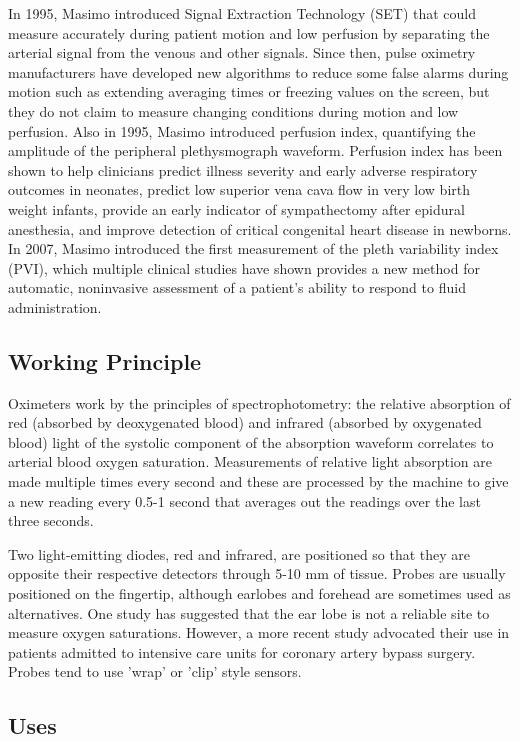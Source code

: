 \documentclass[11pt]{article}
\begin{document}
In 1995, Masimo introduced Signal Extraction Technology (SET) that could measure accurately during patient motion and low perfusion by separating the arterial signal from the venous and other signals. Since then, pulse oximetry manufacturers have developed new algorithms to reduce some false alarms during motion such as extending averaging times or freezing values on the screen, but they do not claim to measure changing conditions during motion and low perfusion. Also in 1995, Masimo introduced perfusion index, quantifying the amplitude of the peripheral plethysmograph waveform. Perfusion index has been shown to help clinicians predict illness severity and early adverse respiratory outcomes in neonates, predict low superior vena cava flow in very low birth weight infants, provide an early indicator of sympathectomy after epidural anesthesia, and improve detection of critical congenital heart disease in newborns. In 2007, Masimo introduced the first measurement of the pleth variability index (PVI), which multiple clinical studies have shown provides a new method for automatic, noninvasive assessment of a patient's ability to respond to fluid administration.

\subsection*{Working Principle}

Oximeters work by the principles of spectrophotometry: the relative absorption of red (absorbed by deoxygenated blood) and infrared (absorbed by oxygenated blood) light of the systolic component of the absorption waveform correlates to arterial blood oxygen saturation. Measurements of relative light absorption are made multiple times every second and these are processed by the machine to give a new reading every 0.5-1 second that averages out the readings over the last three seconds.

Two light-emitting diodes, red and infrared, are positioned so that they are opposite their respective detectors through 5-10 mm of tissue. Probes are usually positioned on the fingertip, although earlobes and forehead are sometimes used as alternatives. One study has suggested that the ear lobe is not a reliable site to measure oxygen saturations. However, a more recent study advocated their use in patients admitted to intensive care units for coronary artery bypass surgery. Probes tend to use 'wrap' or 'clip' style sensors.

\subsection*{Uses}
\end{document}
